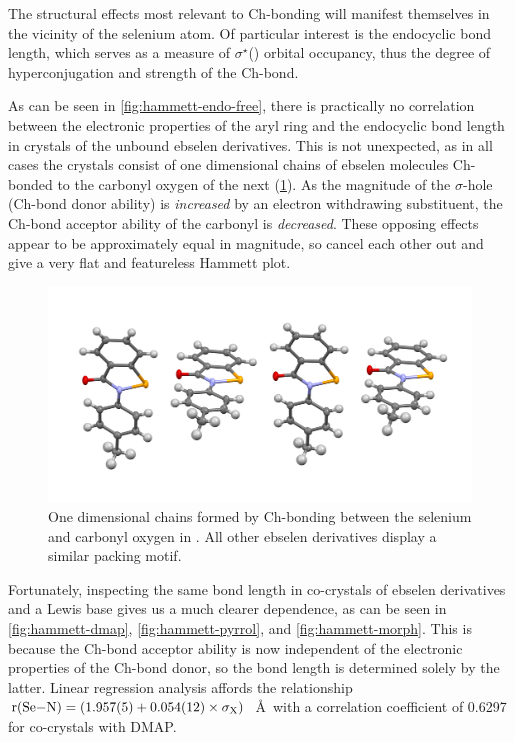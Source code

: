 \begin{refsection}
The structural effects most relevant to Ch-bonding will manifest themselves in the vicinity of the selenium atom.
Of particular interest is the endocyclic  bond length, which serves as a measure of $\sigma^\star$() orbital occupancy, thus the degree of hyperconjugation and strength of the Ch-bond.

As can be seen in \cref{fig:hammett-endo-free}, there is practically no correlation between the electronic properties of the aryl ring and the endocyclic  bond length in crystals of the unbound ebselen derivatives.
This is not unexpected, as in all cases the crystals consist of one dimensional chains of ebselen molecules Ch-bonded to the carbonyl oxygen of the next (\cref{fig:ebs-packing}).
As the magnitude of the $\sigma$-hole (Ch-bond donor ability) is \emph{increased} by an electron withdrawing substituent, the Ch-bond acceptor ability of the carbonyl is \emph{decreased}.
These opposing effects appear to be approximately equal in magnitude, so cancel each other out and give a very flat and featureless Hammett plot.

\begin{figure}
  \centering
  \includegraphics[width=0.6\linewidth]{Figures/ebs.me-packing.pdf}
  \caption[One dimensional chains formed by Ch-bonding between the selenium and carbonyl oxygen in .]{One dimensional chains formed by Ch-bonding between the selenium and carbonyl oxygen in . All other ebselen derivatives display a similar packing motif.}
  \label{fig:ebs-packing}
\end{figure}

Fortunately, inspecting the same bond length in co-crystals of ebselen derivatives and a Lewis base gives us a much clearer dependence, as can be seen in \cref{fig:hammett-dmap}, \cref{fig:hammett-pyrrol}, and \cref{fig:hammett-morph}.
This is because the Ch-bond acceptor ability is now independent of the electronic properties of the Ch-bond donor, so the  bond length is determined solely by the latter.
Linear regression analysis affords the relationship $\mathrm{r}(\ce{Se-N}) = (1.957(5) + 0.054(12) \times \sigma_{\mathrm{X}})$~\AA~with a correlation coefficient of 0.6297 for co-crystals with DMAP.


\end{refsection}
